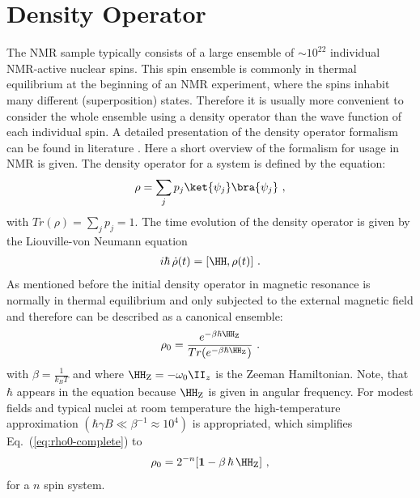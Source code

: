 \section{Density Operator}
\label{sec:density-operator}
The NMR sample typically consists of a large ensemble of $\sim10^{22}$ individual NMR-active nuclear spins. This spin ensemble is commonly in thermal equilibrium at the beginning of an NMR experiment, where the spins inhabit many different (superposition) states. 
Therefore it is usually more convenient to consider the whole ensemble using a density operator than the wave function of each individual spin.
A detailed presentation of the density operator formalism can be found in literature \cite{nielsen_chuang_2010}.
Here a short overview of the formalism for usage in NMR is given.
The density operator for a system is defined by the equation:
\begin{align}
  \rho = \sum_j p_j\ket{\psi_j}\bra{\psi_j}~,
\end{align}
with $Tr(\rho)=\sum_j p_j=1$.
The time evolution of the density operator is given by the Liouville-von Neumann equation
\begin{align}
  \label{eq:Liouville-von Neumann}
  i\hbar \, \dot{\rho}(t) = [\HH,\rho(t)]~.
\end{align}
As mentioned before the initial density operator in magnetic resonance is normally in thermal equilibrium and only subjected to the external magnetic field and therefore can be described as a canonical ensemble: 
\begin{align}
\label{eq:rho0-complete}
 \rho_0=\frac{e^{-\beta {\hbar \HH_\mathrm{Z}}}}{Tr(e^{-\beta {\hbar \HH_\mathrm{Z}}})}~.%
\end{align}
with $\beta = \frac{1}{k_B T}$ and where $\HH_\mathrm{Z}= -\omega_0 \II_z$ is the Zeeman Hamiltonian. Note, that $\hbar$ appears in the equation because $\HH_\mathrm{Z}$ is given in angular frequency.
For modest fields and typical nuclei at room temperature the high-temperature approximation $(\hbar\gamma B \ll \beta^{-1}\approx 10^{4})$ is appropriated, which simplifies Eq.~(\ref{eq:rho0-complete}) to 
\begin{align}
  \rho_0 = 2^{-n}[\mathbf{1}-\beta \,\hbar\, \HH_\mathrm{Z}]~,
\end{align}
for a $n$ spin system.

